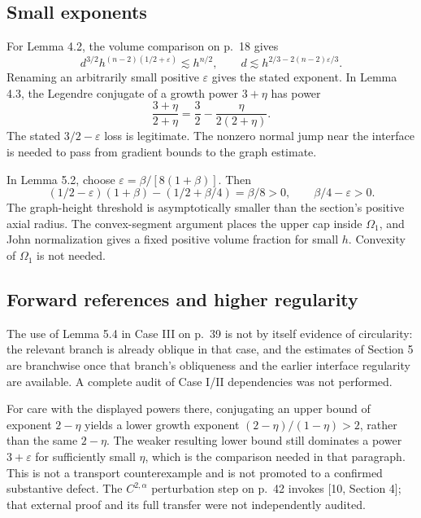 \documentclass[10pt]{article}
\begin{document}
\subsection*{Small exponents}
For Lemma 4.2, the volume comparison on p. 18 gives \[d^{3/2}h^{(n-2)(1/2+\varepsilon)}
 \lesssim h^{n/2},\qquad
 d\lesssim h^{2/3-2(n-2)\varepsilon/3}.\] Renaming an arbitrarily small positive \(\varepsilon\) gives the stated exponent. In Lemma 4.3, the Legendre conjugate of a growth power \(3+\eta\) has power \[\frac{3+\eta}{2+\eta}=\frac32-\frac{\eta}{2(2+\eta)}.\] The stated \(3/2-\varepsilon\) loss is legitimate. The nonzero normal jump near the interface is needed to pass from gradient bounds to the graph estimate.\par
In Lemma 5.2, choose \(\varepsilon=\beta/[8(1+\beta)]\). Then \[(1/2-\varepsilon)(1+\beta)-(1/2+\beta/4)=\beta/8>0,\qquad
 \beta/4-\varepsilon>0.\] The graph-height threshold is asymptotically smaller than the section’s positive axial radius. The convex-segment argument places the upper cap inside \(\Omega_1\), and John normalization gives a fixed positive volume fraction for small \(h\). Convexity of \(\Omega_1\) is not needed.\par
\subsection*{Forward references and higher regularity}
The use of Lemma 5.4 in Case III on p. 39 is not by itself evidence of circularity: the relevant branch is already oblique in that case, and the estimates of Section 5 are branchwise once that branch’s obliqueness and the earlier interface regularity are available. A complete audit of Case I/II dependencies was not performed.\par
For care with the displayed powers there, conjugating an upper bound of exponent \(2-\eta\) yields a lower growth exponent \((2-\eta)/(1-\eta)>2\), rather than the same \(2-\eta\). The weaker resulting lower bound still dominates a power \(3+\varepsilon\) for sufficiently small \(\eta\), which is the comparison needed in that paragraph. This is not a transport counterexample and is not promoted to a confirmed substantive defect. The \(C^{2,\alpha}\) perturbation step on p. 42 invokes [10, Section 4]; that external proof and its full transfer were not independently audited.\par
\end{document}
